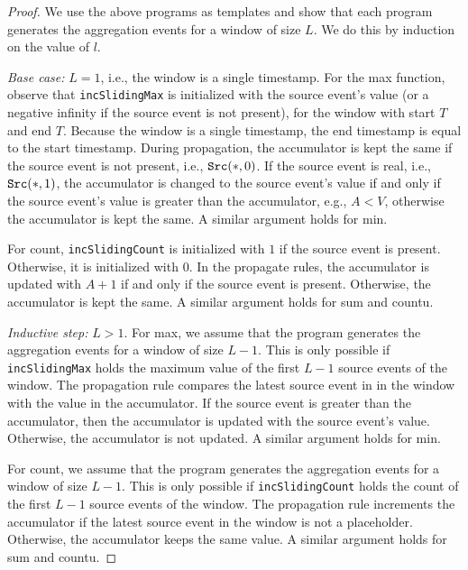 \begin{proof}
We use the above programs as templates
and 
show that each program generates the aggregation events
for a window of size $L$.
We do this by induction on the value of $l$.

\smallskip

{\em Base case:} $L=1$, i.e., the window is a single timestamp.
For the {\sc max} function,
observe that \texttt{incSlidingMax} is initialized with the source event's value
(or a negative infinity if the source event is not present),
for the window with start $T$ and end $T$.
Because the window is a single timestamp,
the end timestamp is equal to the start timestamp.
During propagation,
the accumulator is kept the same if the source event is not present,
i.e., $\mbox{\tt Src}(*,0)$.
If the source event is real,
i.e., $\mbox{\tt Src}(*,1)$,
the accumulator is changed to the source event's value
if and only if the source event's value is greater than the accumulator,
e.g., $A{<}V$,
otherwise the accumulator is kept the same.
A similar argument holds for {\sc min}.

For {\sc count},
\texttt{incSlidingCount} is initialized with $1$ if the source event is present.
Otherwise, it is initialized with $0$.
In the propagate rules,
the accumulator is updated with $A+1$
if and only if the source event is present.
Otherwise, the accumulator is kept the same.
A similar argument holds for {\sc sum}
and {\sc countu}.

\smallskip

{\em Inductive step:} $L>1$.
For {\sc max},
we assume that the program generates the aggregation events
for a window of size $L{-}1$.
This is only possible if
\texttt{incSlidingMax} holds the maximum value
of the first $L{-}1$ source events of the window.
The propagation rule compares the latest source
event in in the window with the value in the accumulator.
If the source event is greater than the accumulator,
then the accumulator is updated with the source event's value.
Otherwise, the accumulator is not updated.
A similar argument holds for {\sc min}.

For {\sc count},
we assume that the program generates the aggregation events
for a window of size $L{-}1$.
This is only possible if
\texttt{incSlidingCount} holds the count
of the first $L{-}1$ source events of the window.
The propagation rule increments the accumulator
if the latest source event in the window is not a placeholder.
Otherwise, the accumulator keeps the same value.
A similar argument holds for {\sc sum} and {\sc countu}.
\end{proof}

